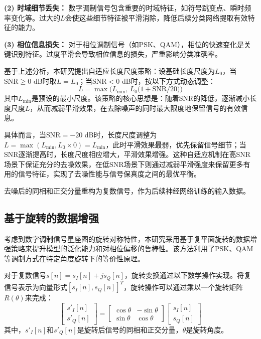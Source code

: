 \documentclass[conference]{IEEEtran}
\begin{document}
\textbf{(2) 时域细节丢失：} 数字调制信号包含重要的时域特征，如符号跳变点、瞬时频率变化等。过大的$L$会使这些细节特征被平滑消除，降低后续分类网络提取有效特征的能力。

\textbf{(3) 相位信息损失：} 对于相位调制信号（如PSK、QAM），相位的快速变化是关键识别特征。过度平滑会导致相位信息的损失，严重影响分类准确率。

基于上述分析，本研究提出自适应长度尺度策略：设基础长度尺度为$L_0$，当$\mathrm{SNR}\ge0$ dB时取$L=L_0$；当$\mathrm{SNR}<0$ dB时，按以下方式动态调整：
\begin{equation}
L = \max\bigl(L_{\min},\,L_0\bigl(1+\mathrm{SNR}/20\bigr)\bigr)
\end{equation}
其中$L_{\min}$是预设的最小尺度。该策略的核心思想是：随着SNR的降低，逐渐减小长度尺度$L$，从而减弱平滑效果，在去除噪声的同时最大限度地保留信号的有效信息。

具体而言，当$\mathrm{SNR}=-20$ dB时，长度尺度调整为$L=\max(L_{\min}, L_0 \times 0)=L_{\min}$，此时平滑效果最弱，优先保留信号细节；当SNR逐渐提高时，长度尺度相应增大，平滑效果增强。这种自适应机制在高SNR场景下保证充分的去噪效果，在低SNR场景下则通过减弱平滑强度来保留更多有用的信号特征，实现了去噪性能与信号保真度之间的最优平衡。

去噪后的同相和正交分量重构为复数信号，作为后续神经网络训练的输入数据。

\subsection{基于旋转的数据增强}

考虑到数字调制信号星座图的旋转对称特性，本研究采用基于复平面旋转的数据增强策略来提升模型的泛化能力和对相位偏移的鲁棒性。该方法利用了PSK、QAM等调制方式在特定角度旋转下的等价性原理。

对于复数信号$s[n] = s_I[n] + js_Q[n]$，旋转变换通过以下数学操作实现。将复信号表示为向量形式$[s_I[n], s_Q[n]]^T$，旋转操作可以通过乘以一个旋转矩阵$R(\theta)$来完成：
\begin{equation}
\begin{bmatrix} s'_I[n] \\ s'_Q[n] \end{bmatrix} = \begin{bmatrix} \cos\theta & -\sin\theta \\ \sin\theta & \cos\theta \end{bmatrix} \begin{bmatrix} s_I[n] \\ s_Q[n] \end{bmatrix}
\end{equation}
其中，$s'_I[n]$和$s'_Q[n]$是旋转后信号的同相和正交分量，$\theta$是旋转角度。
\end{document}
